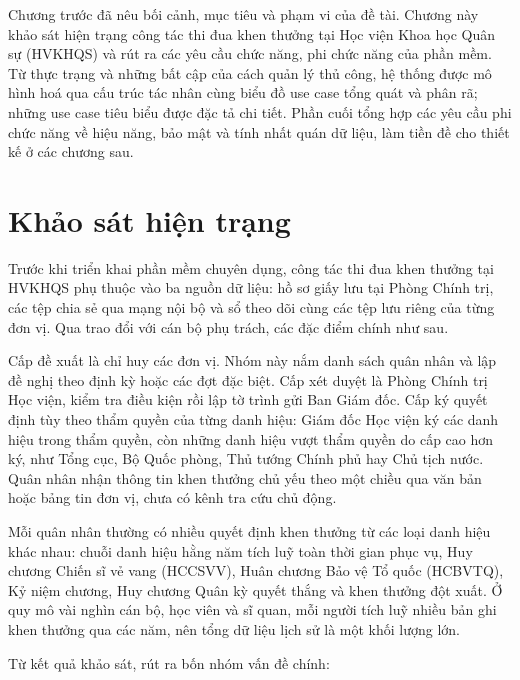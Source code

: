 \documentclass[../DoAn.tex]{subfiles}
\begin{document}
Chương trước đã nêu bối cảnh, mục tiêu và phạm vi của đề tài. Chương này khảo sát hiện trạng công tác thi đua khen thưởng tại Học viện Khoa học Quân sự (HVKHQS) và rút ra các yêu cầu chức năng, phi chức năng của phần mềm.
Từ thực trạng và những bất cập của cách quản lý thủ công, hệ thống được mô hình hoá qua cấu trúc tác nhân cùng biểu đồ use case tổng quát và phân rã; những use case tiêu biểu được đặc tả chi tiết.
Phần cuối tổng hợp các yêu cầu phi chức năng về hiệu năng, bảo mật và tính nhất quán dữ liệu, làm tiền đề cho thiết kế ở các chương sau.

\section{Khảo sát hiện trạng}
\label{section:2.1}

Trước khi triển khai phần mềm chuyên dụng, công tác thi đua khen thưởng tại HVKHQS phụ thuộc vào ba nguồn dữ liệu: hồ sơ giấy lưu tại Phòng Chính trị, các tệp chia sẻ qua mạng nội bộ và sổ theo dõi cùng các tệp lưu riêng của từng đơn vị.
Qua trao đổi với cán bộ phụ trách, các đặc điểm chính như sau.

Cấp đề xuất là chỉ huy các đơn vị.
Nhóm này nắm danh sách quân nhân và lập đề nghị theo định kỳ hoặc các đợt đặc biệt.
Cấp xét duyệt là Phòng Chính trị Học viện, kiểm tra điều kiện rồi lập tờ trình gửi Ban Giám đốc.
Cấp ký quyết định tùy theo thẩm quyền của từng danh hiệu: Giám đốc Học viện ký các danh hiệu trong thẩm quyền, còn những danh hiệu vượt thẩm quyền do cấp cao hơn ký, như Tổng cục, Bộ Quốc phòng, Thủ tướng Chính phủ hay Chủ tịch nước.
Quân nhân nhận thông tin khen thưởng chủ yếu theo một chiều qua văn bản hoặc bảng tin đơn vị, chưa có kênh tra cứu chủ động.

Mỗi quân nhân thường có nhiều quyết định khen thưởng từ các loại danh hiệu khác nhau: chuỗi danh hiệu hằng năm tích luỹ toàn thời gian phục vụ, Huy chương Chiến sĩ vẻ vang (HCCSVV), Huân chương Bảo vệ Tổ quốc (HCBVTQ), Kỷ niệm chương, Huy chương Quân kỳ quyết thắng và khen thưởng đột xuất.
Ở quy mô vài nghìn cán bộ, học viên và sĩ quan, mỗi người tích luỹ nhiều bản ghi khen thưởng qua các năm, nên tổng dữ liệu lịch sử là một khối lượng lớn.

Từ kết quả khảo sát, rút ra bốn nhóm vấn đề chính:
\end{document}
